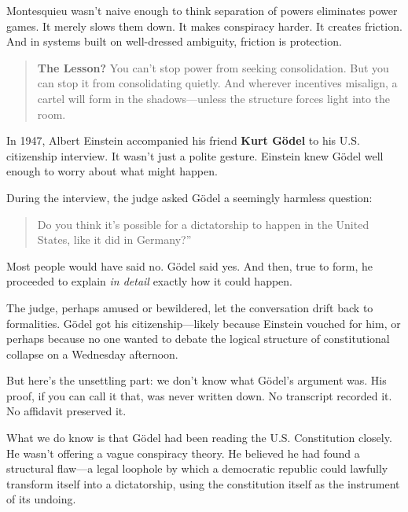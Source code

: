 Montesquieu wasn’t naive enough to think separation of powers eliminates power games. It merely slows them down. It makes conspiracy harder. It creates friction. And in systems built on well-dressed ambiguity, friction is protection.

\medskip

\begin{quote}
\textbf{The Lesson?} You can’t stop power from seeking consolidation. But you can stop it from consolidating quietly. And wherever incentives misalign, a cartel will form in the shadows—unless the structure forces light into the room.
\end{quote}


\begin{tcolorbox}[title=Historical Sidebar: Gödel’s Missing Proof — The Constitutional Loophole That Was Never Written Down, colback=gray!5!white, colframe=black!80!white, breakable, fonttitle=\bfseries]

  In 1947, Albert Einstein accompanied his friend \textbf{Kurt Gödel} to his U.S. citizenship interview. It wasn’t just a polite gesture. Einstein knew Gödel well enough to worry about what might happen.  

  \medskip
  
  During the interview, the judge asked Gödel a seemingly harmless question:  

  \begin{quote}
  Do you think it’s possible for a dictatorship to happen in the United States, like it did in Germany?”
  \end{quote}
  
  Most people would have said no. Gödel said yes. And then, true to form, he proceeded to explain \textit{in detail} exactly how it could happen.  

  \medskip
  
  The judge, perhaps amused or bewildered, let the conversation drift back to formalities. Gödel got his citizenship—likely because Einstein vouched for him, or perhaps because no one wanted to debate the logical structure of constitutional collapse on a Wednesday afternoon.  

  \medskip
  
  But here’s the unsettling part: we don’t know what Gödel’s argument was. His proof, if you can call it that, was never written down. No transcript recorded it. No affidavit preserved it.  

  \medskip
  
  What we do know is that Gödel had been reading the U.S. Constitution closely. He wasn’t offering a vague conspiracy theory. He believed he had found a structural flaw—a legal loophole by which a democratic republic could lawfully transform itself into a dictatorship, using the constitution itself as the instrument of its undoing.  


\end{tcolorbox}
